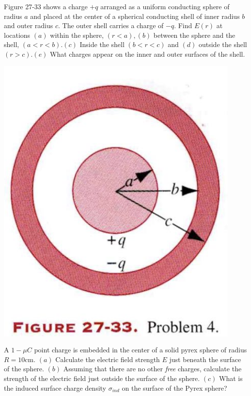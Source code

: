 \documentclass[11pt,letterpaper,boxed]{hmcpset}
\begin{document}
\begin{solution}
\vfill
\end{solution}
\newpage

\begin{problem}[HRK P27.4]
Figure 27-33 shows a charge $+q$ arranged as a uniform conducting sphere of radius $a$ and placed at the center of a spherical conducting shell of inner radius $b$ and outer radius $c$. The outer shell carries a charge of $-q$. Find $E(r)$ at locations $(a)$ within the sphere, $(r<a), (b)$ between the sphere and the shell, $(a<r<b). (c)$ Inside the shell $(b<r<c )$ and $(d)$ outside the shell $(r>c). (e)$ What charges appear on the inner and outer surfaces of the shell. 
\begin{center}
\includegraphics[scale=0.6]{27-33.png}
\end{center}
\end{problem}

\begin{solution}
\vfill
\end{solution}
\newpage

\begin{problem}[HRK E29.29]
A $1-\mu C$ point charge is embedded in the center of  a solid pyrex sphere of radius $R=10$cm. $(a)$ Calculate the electric field strength $E$ just beneath the surface of the sphere. $(b)$ Assuming that there are no other \textit{free} charges, calculate the strength of the electric field just outside the surface of the sphere. $(c)$ What is the induced surface charge density $\sigma_{ind}$ on the surface of the Pyrex sphere? 
\end{problem}

\begin{solution}
\vfill
\end{solution}
\end{document}
